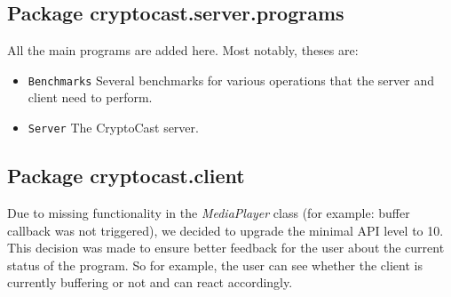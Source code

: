 \documentclass[a4paper,10pt]{scrartcl}
\begin{document}
\subsection{Package cryptocast.server.programs}
All the main programs are added here. Most notably, theses are:
\begin{itemize}
 \item \lstinline|Benchmarks| Several benchmarks for various operations that the
   server and client need to perform.
 \item \lstinline|Server|  The CryptoCast server.
\end{itemize}

\subsection{Package cryptocast.client}
Due to missing functionality in the \textit{MediaPlayer} class (for example: buffer callback was not triggered), we decided to upgrade the minimal API level to 10. This decision was made to ensure better feedback for the user about the current status of the program. So for example, the user can see whether the client is currently buffering or not and can react accordingly.
\end{document}

